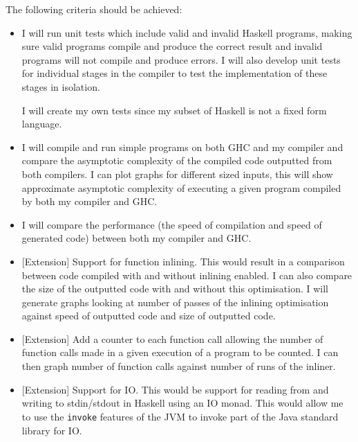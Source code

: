 \documentclass[12pt,a4paper,twoside]{article}
\begin{document}
  The following criteria should be achieved:

  \begin{itemize}

    \item
      I will run unit tests which include valid and invalid Haskell programs, making sure valid programs compile and produce the correct result and invalid
      programs will not compile and produce errors. I will also develop unit tests for individual stages in the compiler to test the implementation of these stages
      in isolation.

      I will create my own tests since my subset of Haskell is not a fixed form language.

    \item

      I will compile and run simple programs on both GHC and my compiler and compare the asymptotic complexity of the
      compiled code outputted from both compilers. I can plot graphs for different sized inputs,
      this will show approximate asymptotic complexity of executing a given program compiled by both my compiler and GHC.

    \item

      I will compare the performance (the speed of compilation and speed of generated code) between both my compiler and GHC.

    \item

      [Extension] Support for function inlining. This would result in a comparison between code compiled with and without inlining enabled. I can also
      compare the size of the outputted code with and without this optimisation. I will generate graphs looking at number of passes of the inlining
      optimisation against speed of outputted code and size of outputted code.

    \item

      [Extension] Add a counter to each function call allowing the number of function calls made in a given execution of a
      program to be counted. I can then graph number of function calls against number of runs of the inliner.

    \item

      [Extension] Support for IO. This would be support for reading from and writing to stdin/stdout in Haskell using an IO monad.
      This would allow me to use the \texttt{invoke} features of the JVM to invoke part of the Java standard library for IO.


\end{itemize}
\end{document}
